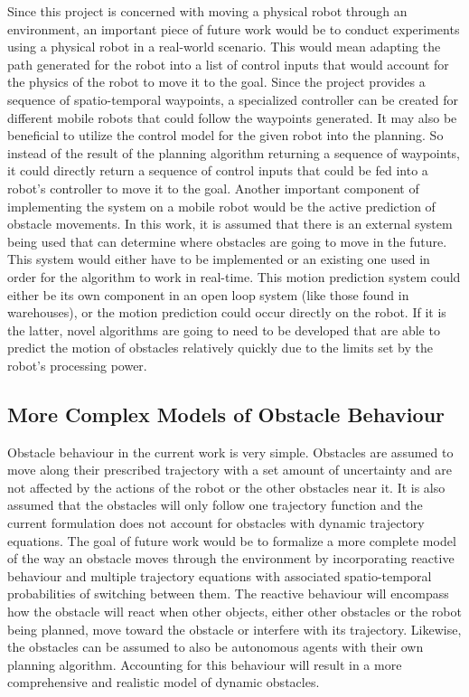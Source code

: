 \documentclass[letterpaper, 10pt, conference]{ieeeconf}
\begin{document}
Since this project is concerned with moving a physical robot through an
environment, an important piece of future work would be to conduct experiments
using a physical robot in a real-world scenario. This would mean adapting the
path generated for the robot into a list of control inputs that would account
for the physics of the robot to move it to the goal. Since the project provides
a sequence of spatio-temporal waypoints, a specialized controller can be
created for different mobile robots that could follow the waypoints generated.
It may also be beneficial to utilize the control model for the given robot into
the planning. So instead of the result of the planning algorithm returning a
sequence of waypoints, it could directly return a sequence of control inputs
that could be fed into a robot's controller to move it to the goal. Another
important component of implementing the system on a mobile robot would be the
active prediction of obstacle movements. In this work, it is assumed that there
is an external system being used that can determine where obstacles are going
to move in the future. This system would either have to be implemented or an
existing one used in order for the algorithm to work in real-time. This motion
prediction system could either be its own component in an open loop system
(like those found in warehouses), or the motion prediction could occur directly
on the robot. If it is the latter, novel algorithms are going to need to be
developed that are able to predict the motion of obstacles relatively quickly
due to the limits set by the robot's processing power.

\subsection{More Complex Models of Obstacle Behaviour}

Obstacle behaviour in the current work is very simple. Obstacles are assumed to
move along their prescribed trajectory with a set amount of uncertainty and are
not affected by the actions of the robot or the other obstacles near it. It is
also assumed that the obstacles will only follow one trajectory function and
the current formulation does not account for obstacles with dynamic trajectory
equations. The goal of future work would be to formalize a more complete model
of the way an obstacle moves through the environment by incorporating reactive
behaviour and multiple trajectory equations with associated spatio-temporal
probabilities of switching between them. The reactive behaviour will encompass
how the obstacle will react when other objects, either other obstacles or the
robot being planned, move toward the obstacle or interfere with its trajectory.
Likewise, the obstacles can be assumed to also be autonomous agents with their
own planning algorithm. Accounting for this behaviour will result in a more
comprehensive and realistic model of dynamic obstacles.
\end{document}
